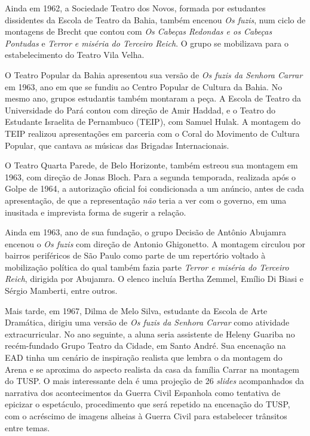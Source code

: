 Ainda em 1962, a Sociedade Teatro dos Novos, formada por estudantes
dissidentes da Escola de Teatro da Bahia, também encenou \textit{Os fuzis},
num ciclo de montagens de Brecht que contou com \textit{Os Cabeças Redondas
e os Cabeças Pontudas} e \textit{Terror e miséria do Terceiro Reich}. O
grupo se mobilizava para o estabelecimento do Teatro Vila Velha.

O Teatro Popular da Bahia apresentou sua versão de \textit{Os fuzis da
Senhora Carrar} em 1963, ano em que se fundiu ao Centro Popular de
Cultura da Bahia. No mesmo ano, grupos estudantis também montaram a
peça. A Escola de Teatro da Universidade do Pará contou com direção de
Amir Haddad, e o Teatro do Estudante Israelita de Pernambuco (TEIP), com
Samuel Hulak. A montagem do TEIP realizou apresentações em parceria com
o Coral do Movimento de Cultura Popular, que cantava as músicas das
Brigadas Internacionais.

O Teatro Quarta Parede, de Belo Horizonte, também estreou sua montagem
em 1963, com direção de Jonas Bloch. Para a segunda temporada, realizada
após o Golpe de 1964, a autorização oficial foi condicionada a um
anúncio, antes de cada apresentação, de que a representação \textit{não}
teria a ver com o governo, em uma inusitada e imprevista forma de
sugerir a relação.

Ainda em 1963, ano de sua fundação, o grupo Decisão de Antônio Abujamra
encenou o \textit{Os fuzis} com direção de Antonio Ghigonetto. A montagem
circulou por bairros periféricos de São Paulo como parte de um
repertório voltado à mobilização política do qual também fazia parte
\textit{Terror e miséria do Terceiro Reich}, dirigida por Abujamra. O
elenco incluía Bertha Zemmel, Emílio Di Biasi e Sérgio Mamberti, entre
outros.

Mais tarde, em 1967, Dilma de Melo Silva, estudante da Escola de Arte
Dramática, dirigiu uma versão de \textit{Os fuzis da Senhora Carrar} como
atividade extracurricular. No ano seguinte, a aluna seria assistente de
Heleny Guariba no recém-fundado Grupo Teatro da Cidade, em Santo André.
Sua encenação na EAD tinha um cenário de inspiração realista que lembra
o da montagem do Arena e se aproxima do aspecto realista da casa da
família Carrar na montagem do TUSP. O mais interessante dela é uma
projeção de 26 \textit{slides} acompanhados da narrativa dos acontecimentos
da Guerra Civil Espanhola como tentativa de epicizar o espetáculo,
procedimento que será repetido na encenação do TUSP, com o acréscimo de
imagens alheias à Guerra Civil para estabelecer trânsitos entre temas.

